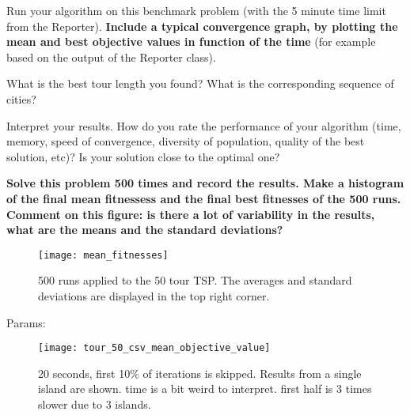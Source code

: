 \documentclass[a4paper,10pt]{article}
\newcommand{\ReplaceMe}[1]{{\color{blue}#1}}
\begin{document}
\ReplaceMe{Run your algorithm on this benchmark problem (with the 5 minute time limit from the Reporter). \textbf{Include a typical convergence graph, by plotting the mean and best objective values in function of the time} (for example based on the output of the Reporter class).

What is the best tour length you found? What is the corresponding sequence of cities?

Interpret your results. How do you rate the performance of your algorithm (time, memory, speed of convergence, diversity of population, quality of the best solution, etc)? Is your solution close to the optimal one?

\textbf{Solve this problem 500 times and record the results. Make a histogram of the final mean fitnessess and the final best fitnesses of the 500 runs. Comment on this figure: is there a lot of variability in the results, what are the means and the standard deviations?}
\begin{figure}
	\centering
	\texttt{[image: mean\_fitnesses]}
	\caption{500 runs applied to the 50 tour TSP. The averages and standard deviations are displayed in the top right corner.}
	\label{fig:meanfitnesses}
\end{figure}

Params:
\begin{figure}
	\centering
	\texttt{[image: tour\_50\_csv\_mean\_objective\_value]}
	\caption{20 seconds, first 10\% of iterations is skipped. Results from a single island are shown. time is a bit weird to interpret. first half is 3 times slower due to 3 islands.}
	\label{fig:tour50csvmeanobjectivevalue}
\end{figure}

}
\end{document}
